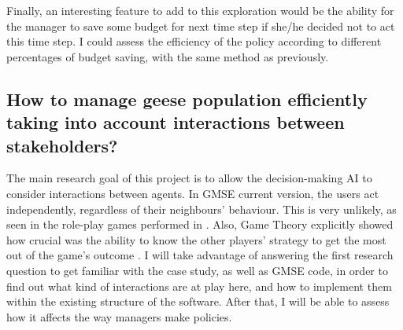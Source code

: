 \documentclass[12pt,a4paper]{article}
\begin{document}
Finally, an interesting feature to add to this exploration would be the ability for the manager to save some budget for next time step if she/he decided not to act this time step.
I could assess the efficiency of the policy according to different percentages of budget saving, with the same method as previously.

%
%

\subsection{How to manage geese population efficiently taking into account interactions between stakeholders?}

The main research goal of this project is to allow the decision-making AI to consider interactions between agents.
In GMSE current version, the users act independently, regardless of their neighbours' behaviour.
This is very unlikely, as seen in the role-play games performed in \cite{redpath2018games}.
Also, Game Theory explicitly showed how crucial was the ability to know the other players' strategy to get the most out of the game's outcome \citep{hilbe2018evolution}.
I will take advantage of answering the first research question to get familiar with the case study, as well as GMSE code, in order to find out what kind of interactions are at play here, and how to implement them within the existing structure of the software.
After that, I will be able to assess how it affects the way managers make policies.
\end{document}
